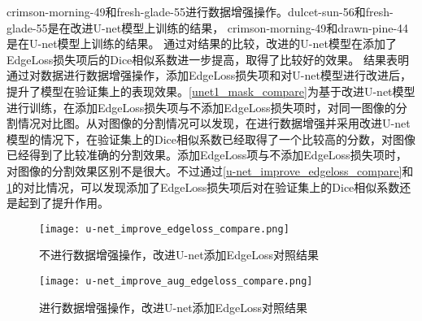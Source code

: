 \documentclass[AutoFakeBold]{LZUThesis}
\begin{document}
crimson-morning-49和fresh-glade-55进行数据增强操作。dulcet-sun-56和fresh-glade-55是在改进U-net模型上训练的结果，
crimson-morning-49和drawn-pine-44是在U-net模型上训练的结果。
通过对结果的比较，改进的U-net模型在添加了EdgeLoss损失项后的Dice相似系数进一步提高，取得了比较好的效果。
结果表明通过对数据进行数据增强操作，添加EdgeLoss损失项和对U-net模型进行改进后，提升了模型在验证集上的表现效果。\cref{unet1_mask_compare}为基于改进U-net模型进行训练，在添加EdgeLoss损失项与不添加EdgeLoss损失项时，对同一图像的分割情况对比图。从对图像的分割情况可以发现，在进行数据增强并采用改进U-net模型的情况下，在验证集上的Dice相似系数已经取得了一个比较高的分数，对图像已经得到了比较准确的分割效果。添加EdgeLoss项与不添加EdgeLoss损失项时，对图像的分割效果区别不是很大。不过通过\cref{u-net_improve_edgeloss_compare}和\cref{u-net_improve_aug_edgeloss_compare}的对比情况，可以发现添加了EdgeLoss损失项后对在验证集上的Dice相似系数还是起到了提升作用。


\begin{figure}[htbp]
    \centering
    \begin{minipage}[t]{0.45\linewidth}  %
        \centering
        \texttt{[image: u-net\_improve\_edgeloss\_compare.png]}
        \caption{不进行数据增强操作，改进U-net添加EdgeLoss对照结果}
        \label{u-net_improve_edgeloss_compare}
    \end{minipage}
    \hfill%
    \begin{minipage}[t]{0.45\linewidth}
        \centering
        \texttt{[image: u-net\_improve\_aug\_edgeloss\_compare.png]}
        \caption{进行数据增强操作，改进U-net添加EdgeLoss对照结果}
        \label{u-net_improve_aug_edgeloss_compare}
    \end{minipage}
\end{figure}
\end{document}
